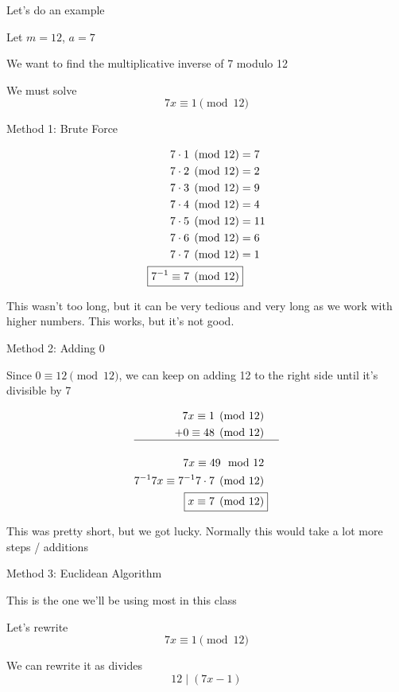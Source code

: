\documentclass[../../Main.tex]{subfiles}
\begin{document}
\begin{example}
    Let's do an example

    Let $m = 12$, $a = 7$

    We want to find the multiplicative inverse of 7 modulo 12

    We must solve $$7x \equiv 1 \pmod{12}$$

    Method 1: Brute Force

    \begin{align*}
        7 \cdot 1 \pmod{12} &= 7 \\
        7 \cdot 2 \pmod{12} &= 2 \\
        7 \cdot 3 \pmod{12} &= 9 \\
        7 \cdot 4 \pmod{12} &= 4 \\
        7 \cdot 5 \pmod{12} &= 11 \\
        7 \cdot 6 \pmod{12} &= 6 \\
        7 \cdot 7 \pmod{12} &= 1 \\
        \Aboxed{7^{-1} \equiv 7 \pmod{12}} 
    \end{align*}

    This wasn't too long, but it can be very tedious and very long as we work with higher numbers. This works, but it's not good.

    Method 2: Adding 0

    Since $0 \equiv 12 \pmod{12}$, we can keep on adding 12 to the right side until it's divisible by 7

    \begin{align*}
        7x \equiv 1 \pmod{12} \\
        +0 \equiv 48 \pmod{12} \\
        \hline \\
        7x \equiv 49 \mod{12} \\
        7^{-1} 7x \equiv 7^{-1}7 \cdot 7 \pmod{12} \\
        \Aboxed{x \equiv 7 \pmod{12}} \\
    \end{align*}

    This was pretty short, but we got lucky. Normally this would take a lot more steps / additions

    Method 3: Euclidean Algorithm

    This is the one we'll be using most in this class

    Let's rewrite 
    $$7x \equiv 1 \pmod{12}$$

    We can rewrite it as divides
    $$12 \mid (7x - 1)$$


\end{example}
\end{document}
